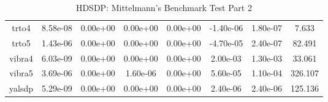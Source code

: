 {{\begin{table}[h]
\begin{center}
{\begin{tabular}{cccccccc}
      trto4 & 8.58e-08 & 0.00e+00 & 0.00e+00 & 0.00e+00 &
      -1.40e-06 & 1.80e-07 & 7.633\\
      trto5 & 1.43e-06 & 0.00e+00 & 0.00e+00 & 0.00e+00 &
      -4.70e-05 & 2.40e-07 & 82.491\\
      vibra4 & 6.03e-09 & 0.00e+00 & 0.00e+00 & 0.00e+00 &
      2.00e-03 & 1.30e-03 & 33.061\\
      vibra5 & 3.69e-06 & 0.00e+00 & 1.60e-06 & 0.00e+00 &
      5.60e-05 & 1.10e-04 & 326.107\\
      yalsdp & 5.29e-09 & 0.00e+00 & 0.00e+00 & 0.00e+00 &
      2.40e-06 & 2.40e-06 & 125.136\\
      \bottomrule
    \end{tabular}
  }  
\end{center}  
\caption{HDSDP: Mittelmann's Benchmark Test Part 2}
\end{table}}}





